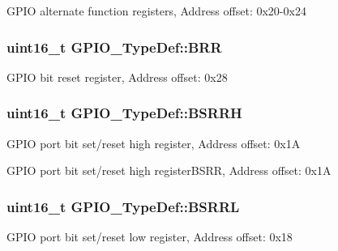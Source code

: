 G\-P\-I\-O alternate function registers, Address offset\-: 0x20-\/0x24 \hypertarget{struct_g_p_i_o___type_def_a08108dc67ac01f2d1c18a085c3bbffdd}{
\subsubsection[{B\-R\-R}]{ uint16\-\_\-t G\-P\-I\-O\-\_\-\-Type\-Def\-::\-B\-R\-R}}\label{struct_g_p_i_o___type_def_a08108dc67ac01f2d1c18a085c3bbffdd}
G\-P\-I\-O bit reset register, Address offset\-: 0x28 \hypertarget{struct_g_p_i_o___type_def_ad4b5f8bc936e26e3980686d2aba9d882}{
\subsubsection[{B\-S\-R\-R\-H}]{ uint16\-\_\-t G\-P\-I\-O\-\_\-\-Type\-Def\-::\-B\-S\-R\-R\-H}}\label{struct_g_p_i_o___type_def_ad4b5f8bc936e26e3980686d2aba9d882}
G\-P\-I\-O port bit set/reset high register, Address offset\-: 0x1\-A

G\-P\-I\-O port bit set/reset high register\-B\-S\-R\-R, Address offset\-: 0x1\-A \hypertarget{struct_g_p_i_o___type_def_ad2528bbb921532be8116534651b1faee}{
\subsubsection[{B\-S\-R\-R\-L}]{ uint16\-\_\-t G\-P\-I\-O\-\_\-\-Type\-Def\-::\-B\-S\-R\-R\-L}}\label{struct_g_p_i_o___type_def_ad2528bbb921532be8116534651b1faee}
G\-P\-I\-O port bit set/reset low register, Address offset\-: 0x18

